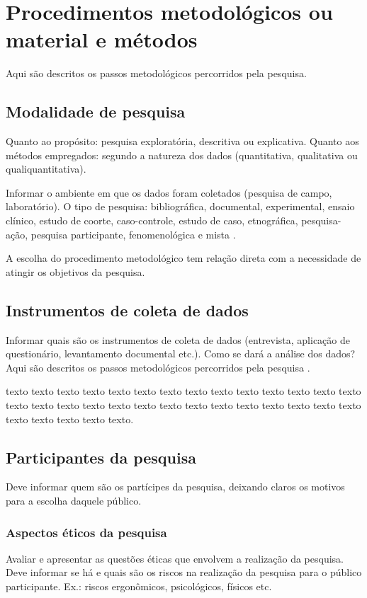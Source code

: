 \chapter{Procedimentos metodológicos ou material e métodos}

Aqui são descritos os passos metodológicos percorridos pela pesquisa.

\section{Modalidade de pesquisa}

Quanto ao propósito: pesquisa exploratória, descritiva ou explicativa. Quanto
aos métodos empregados: segundo a natureza dos dados (quantitativa, qualitativa ou
qualiquantitativa).

Informar o ambiente em que os dados foram coletados (pesquisa de campo,
laboratório). O tipo de pesquisa: bibliográfica, documental, experimental, ensaio
clínico, estudo de coorte, caso-controle, estudo de caso, etnográfica, pesquisa-ação,
pesquisa participante, fenomenológica e mista \cite{araujo2012}.

A escolha do procedimento metodológico tem relação direta com a necessidade de atingir os objetivos da pesquisa.

\section{Instrumentos de coleta de dados}

Informar quais são os instrumentos de coleta de dados (entrevista, aplicação
de questionário, levantamento documental etc.). Como se dará a análise dos dados?
Aqui são descritos os passos metodológicos percorridos pela pesquisa \cite{IFPI_manual}.

texto texto texto texto texto texto texto texto texto texto texto texto texto texto texto 
texto texto texto texto texto texto texto texto texto texto texto texto texto texto texto 
texto texto texto.

\section{Participantes da pesquisa}

Deve informar quem são os partícipes da pesquisa, deixando claros os motivos
para a escolha daquele público.

\subsection{Aspectos éticos da pesquisa}

Avaliar e apresentar as questões éticas que envolvem a realização da
pesquisa. Deve informar se há e quais são os riscos na realização da pesquisa para
o público participante. Ex.: riscos ergonômicos, psicológicos, físicos etc.
